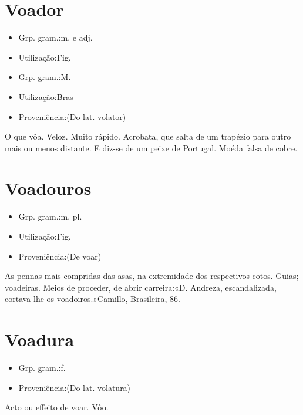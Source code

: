 \documentclass{article}
\begin{document}
\section{Voador}
\begin{itemize}
\item {Grp. gram.:m.  e  adj.}
\end{itemize}
\begin{itemize}
\item {Utilização:Fig.}
\end{itemize}
\begin{itemize}
\item {Grp. gram.:M.}
\end{itemize}
\begin{itemize}
\item {Utilização:Bras}
\end{itemize}
\begin{itemize}
\item {Proveniência:(Do lat. \textunderscore volator\textunderscore )}
\end{itemize}
O que vôa.
Veloz.
Muito rápido.
Acrobata, que salta de um trapézio para outro mais ou menos distante.
E diz-se de um peixe de Portugal.
Moéda falsa de cobre.
\section{Voadouros}
\begin{itemize}
\item {Grp. gram.:m. pl.}
\end{itemize}
\begin{itemize}
\item {Utilização:Fig.}
\end{itemize}
\begin{itemize}
\item {Proveniência:(De \textunderscore voar\textunderscore )}
\end{itemize}
As pennas mais compridas das asas, na extremidade dos respectivos cotos.
Guias; voadeiras.
Meios de proceder, de abrir carreira:«\textunderscore D. Andreza, escandalizada, cortava-lhe os voadoiros.\textunderscore »Camillo, \textunderscore Brasileira\textunderscore , 86.
\section{Voadura}
\begin{itemize}
\item {Grp. gram.:f.}
\end{itemize}
\begin{itemize}
\item {Proveniência:(Do lat. \textunderscore volatura\textunderscore )}
\end{itemize}
Acto ou effeito de voar.
Vôo.
\end{document}
